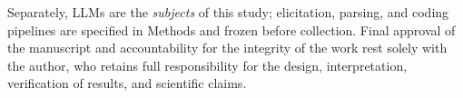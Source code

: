\documentclass[10pt]{article}
\begin{document}
Separately, LLMs are the \emph{subjects} of this study; elicitation,
parsing, and coding pipelines are specified in Methods and frozen before
collection. Final approval of the manuscript and accountability for the
integrity of the work rest solely with the author, who retains full
responsibility for the design, interpretation, verification of results, and
scientific claims.
\end{document}
